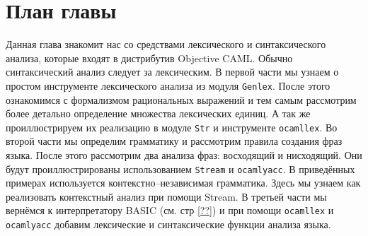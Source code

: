 \section{План главы}

Данная глава знакомит нас со средствами лексического и синтаксического анализа,
которые входят в дистрибутив Objective CAML. Обычно синтаксический анализ
следует за лексическим. В первой части мы узнаем о простом инструменте
лексического анализа из модуля \texttt{Genlex}. После этого ознакомимся с
формализмом рациональных выражений и тем самым рассмотрим более детально
определение множества лексических единиц. А так же проиллюстрируем их реализацию
в модуле \texttt{Str} и инструменте \texttt{ocamllex}. Во второй части мы
определим грамматику и рассмотрим правила создания фраз языка. После этого
рассмотрим два анализа фраз: восходящий и нисходящий. Они будут
проиллюстрированы использованием \texttt{Stream} и \texttt{ocamlyacc}. В
приведённых примерах используется контекстно–независимая грамматика. Здесь мы
узнаем как реализовать контекстный анализ при помощи Stream. В третьей части мы
вернёмся к интерпретатору BASIC (см. стр \ref{??}) и при помощи
\texttt{ocamllex} и \texttt{ocamlyacc} добавим лексические и синтаксические
функции анализа языка.
